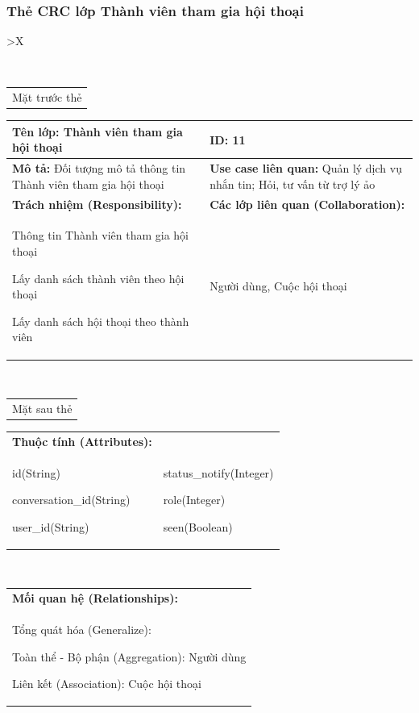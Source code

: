   \subsubsection{Thẻ CRC lớp Thành viên tham gia hội thoại}
  \begin{xltabular}{\textwidth}{
    >{\centering\arraybackslash}X 
  }
  \caption{\bfseries \fontsize{12pt}{0pt}\selectfont Thẻ CRC lớp Tài khoản}
  \\
  \begin{tabularx}{0.9\textwidth}{X}
    Mặt trước thẻ
  \end{tabularx}
  \begin{tabularx}{0.9\textwidth}{|X|X|}
    \hline
    \textbf{Tên lớp:} Thành viên tham gia hội thoại & \textbf{ID:} 11 \\
    \hline
    \textbf{Mô tả:} Đối tượng mô tả thông tin Thành viên tham gia hội thoại & \textbf{Use case liên quan:} Quản lý dịch vụ nhắn tin; Hỏi, tư vấn từ trợ lý ảo \\
    \hline
    \textbf{Trách nhiệm (Responsibility):} & \textbf{Các lớp liên quan (Collaboration):} \\
    Thông tin Thành viên tham gia hội thoại

    Lấy danh sách thành viên theo hội thoại

    Lấy danh sách hội thoại theo thành viên
    & 
    Người dùng, Cuộc hội thoại 
    \\
    \hline
  \end{tabularx}
  \\ 
  \begin{tabularx}{0.9\textwidth}{X}
    Mặt sau thẻ
  \end{tabularx} 
  \begin{tabularx}{0.9\textwidth}{|X|X|}
    \hline
    \textbf{Thuộc tính (Attributes):} & \\
    id(String) 
    
    conversation\_id(String)

    user\_id(String)
    &
    status\_notify(Integer)

    role(Integer)

    seen(Boolean)
    \\
    \hline
  \end{tabularx}
  \\     
  \begin{tabularx}{0.9\textwidth}{|X|}
    \textbf{Mối quan hệ (Relationships):} \\
    Tổng quát hóa (Generalize):  

    Toàn thể - Bộ phận (Aggregation): Người dùng
    
    Liên kết (Association): Cuộc hội thoại
    \\
    \hline
  \end{tabularx}
  \end{xltabular}

